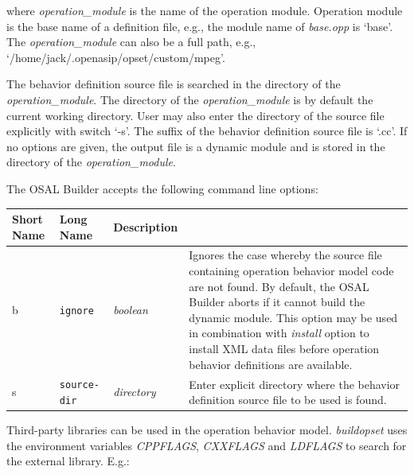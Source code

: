 \documentclass[a4paper,twoside]{tceusermanual}
\begin{document}

where \emph{operation\_module} is the name of the operation module. 
Operation module is the base name of a definition file, e.g., the module
name of \emph{base.opp} is `base'. The \emph{operation\_module} can also be
a full path, e.g., `/home/jack/.openasip/opset/custom/mpeg'.

The behavior definition source file is searched in the directory of the
\emph{operation\_module}. The directory of the \emph{operation\_module} is
by 
default the current working directory. User may also enter the directory of
the source file explicitly with switch `-s'. The suffix of the
behavior definition source file is `.cc'.
%
If no options are given, the output file is a dynamic module and is stored
in the directory of the \emph{operation\_module}.  

The OSAL Builder accepts the following command line options:

\begin{center}
\begin{longtable}[htb]{@{}p{}@{}p{}@{}p{}%
                     @{}p{}}

\textbf{Short Name} &\textbf{Long Name} &\textbf{Description} \\
\hline

b & \verb|ignore|         & \emph{boolean} &

Ignores the case whereby the source file containing operation behavior model
code are not found.  By default, the OSAL Builder aborts if it cannot build
the dynamic module.  This option may be used in combination with
\emph{install} option to install XML data files before operation behavior
definitions are available.\\

s & \verb|source-dir|         & \emph{directory} &

Enter explicit directory where the behavior definition source file to
be used is found.

\end{longtable}
\end{center}

Third-party libraries can be used in the operation behavior model.
\emph{buildopset} uses the environment variables \emph{CPPFLAGS}, 
\emph{CXXFLAGS} and \emph{LDFLAGS} to search for the external library. E.g.: 

\end{document}
